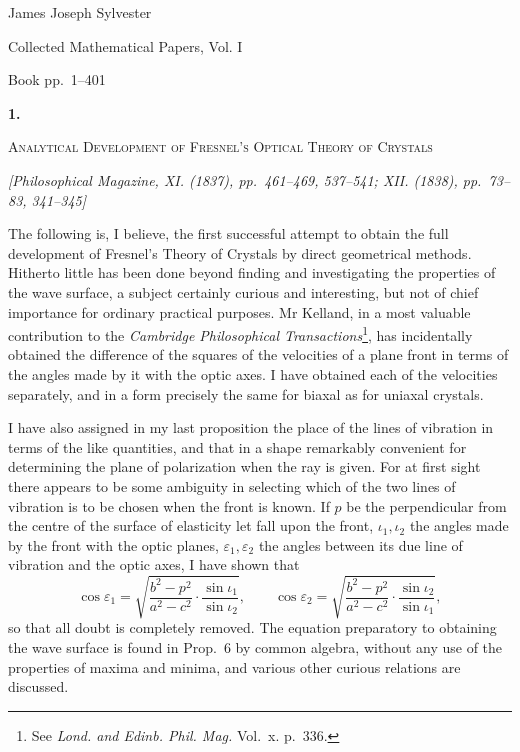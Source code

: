 \documentclass[11pt]{article}
\newcommand{\paperhead}[3]{%
  \clearpage
  \begin{center}
  {\Large\bfseries #1.}\par\vspace{0.85em}
  {\large\scshape #2}\par\vspace{0.6em}
  {\itshape [#3]}\par
  \end{center}\vspace{0.4em}}
\newcommand{\sourcepage}[1]{\marginpar{\scriptsize p.~#1}}
\begin{document}
\begin{center}
{\Large James Joseph Sylvester}\par\vspace{0.25em}
{\large Collected Mathematical Papers, Vol. I}\par\vspace{0.25em}
{\normalsize Book pp.~1--401}\par
\end{center}
\thispagestyle{empty}
\vspace{0.75em}

\paperhead{1}{Analytical Development of Fresnel's Optical Theory of Crystals}{Philosophical Magazine, XI. (1837), pp.~461--469, 537--541; XII. (1838), pp.~73--83, 341--345}

\sourcepage{1}
The following is, I believe, the first successful attempt to obtain the full development of Fresnel's Theory of Crystals by direct geometrical methods. Hitherto little has been done beyond finding and investigating the properties of the wave surface, a subject certainly curious and interesting, but not of chief importance for ordinary practical purposes. Mr Kelland, in a most valuable contribution to the \emph{Cambridge Philosophical Transactions}\footnote{See \emph{Lond. and Edinb. Phil. Mag.} Vol.~x. p.~336.}, has incidentally obtained the difference of the squares of the velocities of a plane front in terms of the angles made by it with the optic axes. I have obtained each of the velocities separately, and in a form precisely the same for biaxal as for uniaxal crystals.

I have also assigned in my last proposition the place of the lines of vibration in terms of the like quantities, and that in a shape remarkably convenient for determining the plane of polarization when the ray is given. For at first sight there appears to be some ambiguity in selecting which of the two lines of vibration is to be chosen when the front is known. If $p$ be the perpendicular from the centre of the surface of elasticity let fall upon the front, $\iota_1,\iota_2$ the angles made by the front with the optic planes, $\varepsilon_1,\varepsilon_2$ the angles between its due line of vibration and the optic axes, I have shown that
\[
\cos \varepsilon_1=
\sqrt{\frac{b^2-p^2}{a^2-c^2}\cdot\frac{\sin\iota_1}{\sin\iota_2}},
\qquad
\cos \varepsilon_2=
\sqrt{\frac{b^2-p^2}{a^2-c^2}\cdot\frac{\sin\iota_2}{\sin\iota_1}},
\]
so that all doubt is completely removed. The equation preparatory to obtaining the wave surface is found in Prop.~6 by common algebra, without any use of the properties of maxima and minima, and various other curious relations are discussed.
\end{document}
